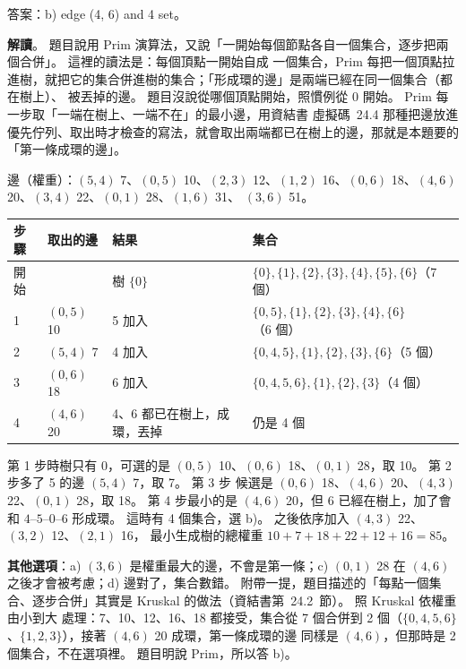 \begin{pastsoln}
答案：b) edge (4, 6) and 4 set。

\textbf{解讀}。 題目說用 Prim 演算法，又說「一開始每個節點各自一個集合，逐步把兩個合併」。 這裡的讀法是：每個頂點一開始自成
一個集合，Prim 每把一個頂點拉進樹，就把它的集合併進樹的集合；「形成環的邊」是兩端已經在同一個集合（都在樹上）、
被丟掉的邊。 題目沒說從哪個頂點開始，照慣例從 0 開始。 Prim 每一步取「一端在樹上、一端不在」的最小邊，用資結書
虛擬碼~24.4 那種把邊放進優先佇列、取出時才檢查的寫法，就會取出兩端都已在樹上的邊，那就是本題要的「第一條成環的邊」。

邊（權重）：$(5,4)$ 7、$(0,5)$ 10、$(2,3)$ 12、$(1,2)$ 16、$(0,6)$ 18、$(4,6)$ 20、$(3,4)$ 22、$(0,1)$ 28、$(1,6)$ 31、
$(3,6)$ 51。
\begin{center}
\small
\begin{tabular}{llll}
\toprule
步驟 & 取出的邊 & 結果 & 集合 \\
\midrule
開始 & & 樹 $\{0\}$ & $\{0\},\{1\},\{2\},\{3\},\{4\},\{5\},\{6\}$（7 個） \\
1 & $(0,5)$ 10 & 5 加入 & $\{0,5\},\{1\},\{2\},\{3\},\{4\},\{6\}$（6 個） \\
2 & $(5,4)$ 7 & 4 加入 & $\{0,4,5\},\{1\},\{2\},\{3\},\{6\}$（5 個） \\
3 & $(0,6)$ 18 & 6 加入 & $\{0,4,5,6\},\{1\},\{2\},\{3\}$（4 個） \\
4 & $(4,6)$ 20 & 4、6 都已在樹上，成環，丟掉 & 仍是 4 個 \\
\bottomrule
\end{tabular}
\end{center}
第 1 步時樹只有 0，可選的是 $(0,5)$ 10、$(0,6)$ 18、$(0,1)$ 28，取 10。 第 2 步多了 5 的邊 $(5,4)$ 7，取 7。 第 3 步
候選是 $(0,6)$ 18、$(4,6)$ 20、$(4,3)$ 22、$(0,1)$ 28，取 18。 第 4 步最小的是 $(4,6)$ 20，但 6 已經在樹上，加了會和
$4\text{--}5\text{--}0\text{--}6$ 形成環。 這時有 4 個集合，選 b)。 之後依序加入 $(4,3)$ 22、$(3,2)$ 12、$(2,1)$ 16，
最小生成樹的總權重 $10 + 7 + 18 + 22 + 12 + 16 = 85$。

\textbf{其他選項}：a) $(3,6)$ 是權重最大的邊，不會是第一條；c) $(0,1)$ 28 在 $(4,6)$ 之後才會被考慮；d) 邊對了，集合數錯。
附帶一提，題目描述的「每點一個集合、逐步合併」其實是 Kruskal 的做法（資結書第~24.2~節）。 照 Kruskal 依權重由小到大
處理：7、10、12、16、18 都接受，集合從 7 個合併到 2 個（$\{0,4,5,6\}$、$\{1,2,3\}$），接著 $(4,6)$ 20 成環，第一條成環的邊
同樣是 $(4,6)$，但那時是 2 個集合，不在選項裡。 題目明說 Prim，所以答 b)。
\end{pastsoln}
